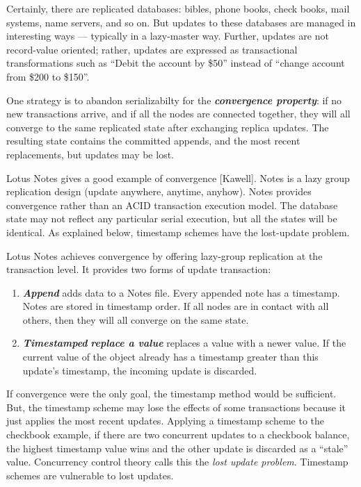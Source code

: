 \documentclass[a4paper,12pt,twoside,openright]{article}
\begin{document}
Certainly, there are replicated databases: bibles, phone books, check
books, mail systems, name servers, and so on. But updates to these
databases are managed in interesting ways --- typically in a lazy-master
way. Further, updates are not record-value oriented; rather, updates are
expressed as transactional transformations such as ``Debit the account
by \$50'' instead of ``change account from \$200 to \$150''.

One strategy is to abandon serializabilty for the
\emph{\textbf{convergence property}}: if no new transactions arrive, and
if all the nodes are connected together, they will all converge to the
same replicated state after exchanging replica updates. The resulting
state contains the committed appends, and the most recent replacements,
but updates may be lost.

Lotus Notes gives a good example of convergence {[}Kawell{]}. Notes is a
lazy group replication design (update anywhere, anytime, anyhow). Notes
provides convergence rather than an ACID transaction execution model.
The database state may not reflect any particular serial execution, but
all the states will be identical. As explained below, timestamp schemes
have the lost-update problem.

Lotus Notes achieves convergence by offering lazy-group replication at
the transaction level. It provides two forms of update transaction:

\begin{enumerate}
\def\labelenumi{\arabic{enumi}.}
\item
  \emph{\textbf{Append}} adds data to a Notes file. Every appended note
  has a timestamp. Notes are stored in timestamp order. If all nodes are
  in contact with all others, then they will all converge on the same
  state.
\item
  \emph{\textbf{Timestamped}} \emph{\textbf{replace a value}} replaces a
  value with a newer value. If the current value of the object already
  has a timestamp greater than this update's timestamp, the incoming
  update is discarded.
\end{enumerate}

If convergence were the only goal, the timestamp method would be
sufficient. But, the timestamp scheme may lose the effects of some
transactions because it just applies the most recent updates. Applying a
timestamp scheme to the checkbook example, if there are two concurrent
updates to a checkbook balance, the highest timestamp value wins and the
other update is discarded as a ``stale'' value. Concurrency control
theory calls this the \emph{lost update problem}. Timestamp schemes are
vulnerable to lost updates.
\end{document}
